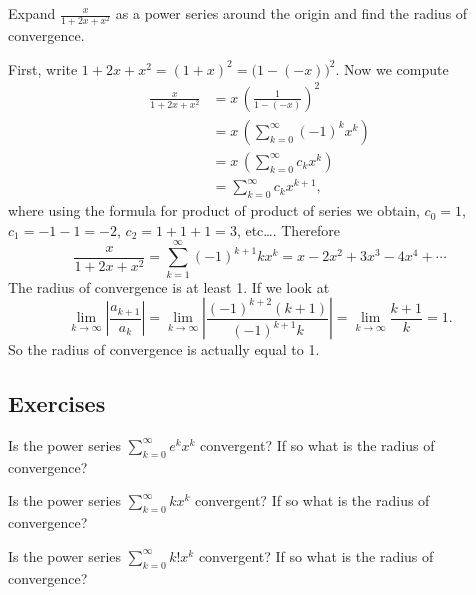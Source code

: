 \documentclass[12pt]{book}
\begin{document}
\begin{example}
Expand $\frac{x}{1+2x+x^2}$ as a power series around the origin and
find the radius of convergence.

First, write $1+2x+x^2 = {(1+x)}^2 = {\bigl(1-(-x)\bigr)}^2$.  Now we
compute
\begin{equation*}
\begin{split}
\frac{x}{1+2x+x^2}
&=
x \,
{\left(
\frac{1}{1-(-x)}
\right)}^2
\\
&=
x \,
\left( 
\sum_{k=0}^\infty (-1)^k x^k 
\right)
\\
&=
x \,
\left(
\sum_{k=0}^\infty c_k x^k 
\right)
\\
&=
\sum_{k=0}^\infty c_k x^{k+1} ,
\end{split}
\end{equation*}
where using the formula for product of product of series
we obtain, $c_0 = 1$, $c_1 = -1 -1 = -2$, $c_2 = 1+1+1 = 3$, etc\ldots.
Therefore
\begin{equation*}
\frac{x}{1+2x+x^2}
=
\sum_{k=1}^\infty (-1)^{k+1} k x^k
= x-2x^2+3x^3-4x^4+\cdots
\end{equation*}
The radius of convergence is at least 1.  If we look at
\begin{equation*}
\lim_{k\to\infty}
\left\lvert \frac{a_{k+1}}{a_k} \right\rvert
=
\lim_{k\to\infty}
\left\lvert \frac{(-1)^{k+2} (k+1)}{(-1)^{k+1}k} \right\rvert
=
\lim_{k\to\infty}
\frac{k+1}{k}
= 1 .
\end{equation*}
So the radius of convergence is actually equal to 1.
\end{example}

\subsection{Exercises}

\begin{exercise}
Is the power series $\displaystyle \sum_{k=0}^\infty e^k x^k$ convergent?
If so what is the radius of convergence?
\end{exercise}

\begin{exercise}
Is the power series $\displaystyle \sum_{k=0}^\infty k x^k$ convergent?
If so what is the radius of convergence?
\end{exercise}

\begin{exercise}
Is the power series $\displaystyle \sum_{k=0}^\infty k! x^k$ convergent?
If so what is the radius of convergence?
\end{exercise}
\end{document}
